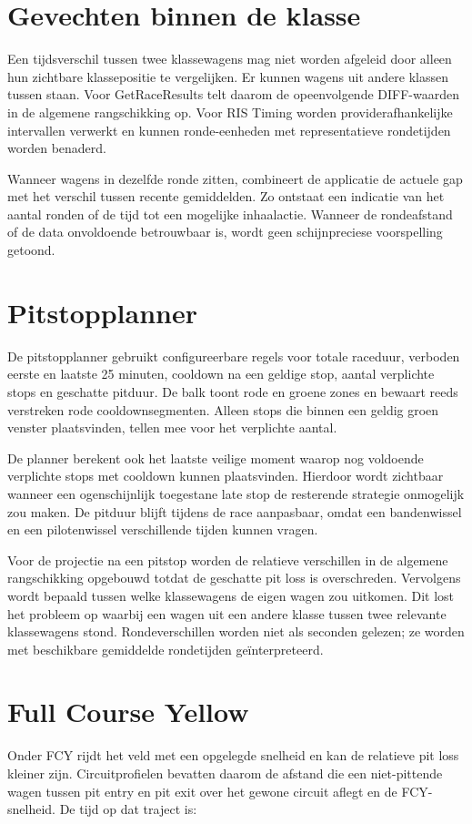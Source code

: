 \section{Gevechten binnen de klasse}
Een tijdsverschil tussen twee klassewagens mag niet worden afgeleid door alleen hun zichtbare klassepositie te vergelijken. Er kunnen wagens uit andere klassen tussen staan. Voor GetRaceResults telt  daarom de opeenvolgende DIFF-waarden in de algemene rangschikking op. Voor RIS Timing worden providerafhankelijke intervallen verwerkt en kunnen ronde-eenheden met representatieve rondetijden worden benaderd.

Wanneer wagens in dezelfde ronde zitten, combineert de applicatie de actuele gap met het verschil tussen recente gemiddelden. Zo ontstaat een indicatie van het aantal ronden of de tijd tot een mogelijke inhaalactie. Wanneer de rondeafstand of de data onvoldoende betrouwbaar is, wordt geen schijnpreciese voorspelling getoond.

\section{Pitstopplanner}
De pitstopplanner gebruikt configureerbare regels voor totale raceduur, verboden eerste en laatste 25 minuten, cooldown na een geldige stop, aantal verplichte stops en geschatte pitduur. De balk toont rode en groene zones en bewaart reeds verstreken rode cooldownsegmenten. Alleen stops die binnen een geldig groen venster plaatsvinden, tellen mee voor het verplichte aantal.

De planner berekent ook het laatste veilige moment waarop nog voldoende verplichte stops met cooldown kunnen plaatsvinden. Hierdoor wordt zichtbaar wanneer een ogenschijnlijk toegestane late stop de resterende strategie onmogelijk zou maken. De pitduur blijft tijdens de race aanpasbaar, omdat een bandenwissel en een pilotenwissel verschillende tijden kunnen vragen.

Voor de projectie na een pitstop worden de relatieve verschillen in de algemene rangschikking opgebouwd totdat de geschatte pit loss is overschreden. Vervolgens wordt bepaald tussen welke klassewagens de eigen wagen zou uitkomen. Dit lost het probleem op waarbij een wagen uit een andere klasse tussen twee relevante klassewagens stond. Rondeverschillen worden niet als seconden gelezen; ze worden met beschikbare gemiddelde rondetijden geïnterpreteerd.

\section{Full Course Yellow}
Onder FCY rijdt het veld met een opgelegde snelheid en kan de relatieve pit loss kleiner zijn. Circuitprofielen bevatten daarom de afstand die een niet-pittende wagen tussen pit entry en pit exit over het gewone circuit aflegt en de FCY-snelheid. De tijd op dat traject is:

